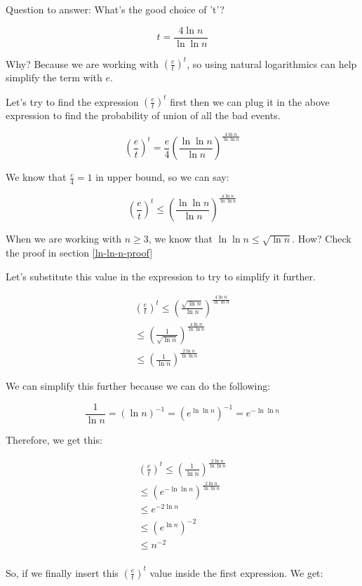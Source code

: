 \documentclass{article}
\begin{document}
Question to answer: What's the good choice of 't'?

$$t = \frac{4 \ln n}{\ln \ln n}$$

Why? Because we are working with $\left(\frac{e}{t}\right)^t$, so using natural logarithmics can help simplify the term with $e$.

Let's try to find the expression $\left(\frac{e}{t}\right)^t$ first then we can plug it in the above expression to find the probability of union of all the bad events.

$$\left(\frac{e}{t}\right)^t = \frac{e}{4} \left(\frac{\ln \ln n}{\ln n}\right)^{\frac{4 \ln n}{\ln \ln n}}$$

We know that $\frac{e}{4} = 1$ in upper bound, so we can say:

$$\left(\frac{e}{t}\right)^t \leq \left(\frac{\ln \ln n}{\ln n}\right)^{\frac{4 \ln n}{\ln \ln n}}$$

When we are working with $n \geq 3$, we know that $\ln \ln n \leq \sqrt{\ln n}$. How? Check the proof in section \ref{ln-ln-n-proof}

Let's substitute this value in the expression to try to simplify it further.

\begin{align*}
    \left(\frac{e}{t}\right)^t \leq \left(\frac{\sqrt{\ln n}}{\ln n}\right)^{\frac{4 \ln n}{\ln \ln n}} \\
    \leq \left(\frac{1}{\sqrt{\ln n}}\right)^{\frac{4 \ln n}{\ln \ln n}} \\
    \leq \left(\frac{1}{\ln n}\right)^{\frac{2 \ln n}{\ln \ln n}}
\end{align*}

We can simplify this further because we can do the following: 

$$
\frac{1}{\ln n} = (\ln n)^{-1} = (e^{\ln \ln n})^{-1} = e^{-\ln \ln n}
$$

Therefore, we get this:

\begin{align*}
     \left(\frac{e}{t}\right)^t \leq \left(\frac{1}{\ln n}\right)^{\frac{2 \ln n}{\ln \ln n}} \\
     \leq \left(e^{-\ln \ln n}\right)^{\frac{2 \ln n}{\ln \ln n}} \\
     \leq e^{-2 \ln n} \\
     \leq (e^{\ln n})^{-2} \\
     \leq n^{-2} \\
\end{align*}

So, if we finally insert this $\left(\frac{e}{t}\right)^t$ value inside the first expression. We get:
\end{document}
